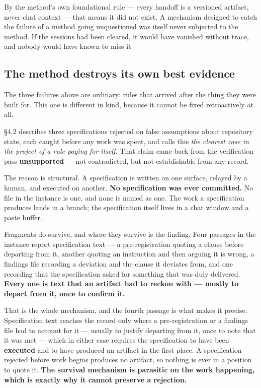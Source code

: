 By the method's own foundational rule --- every handoff is a versioned artifact, never chat context --- that means it did not exist. A mechanism designed to catch the failure of a method going unquestioned was itself never subjected to the method. If the sessions had been cleared, it would have vanished without trace, and nobody would have known to miss it.

\subsection{The method destroys its own best evidence}

The three failures above are ordinary: rules that arrived after the thing they were built for. This one is different in kind, because it cannot be fixed retroactively at all.

\S4.2 describes three specifications rejected on false assumptions about repository state, each caught before any work was spent, and calls this \textit{the clearest case in the project of a rule paying for itself.} That claim came back from the verification pass \textbf{unsupported} --- not contradicted, but not establishable from any record.

The reason is structural. A specification is written on one surface, relayed by a human, and executed on another. \textbf{No specification was ever committed.} No file in the instance is one, and none is named as one. The work a specification produces lands in a branch; the specification itself lives in a chat window and a paste buffer.

Fragments do survive, and where they survive is the finding. Four passages in the instance report specification text --- a pre-registration quoting a clause before departing from it, another quoting an instruction and then arguing it is wrong, a findings file recording a deviation and the clause it deviates from, and one recording that the specification asked for something that was duly delivered. \textbf{Every one is text that an artifact had to reckon with --- mostly to depart from it, once to confirm it.}

That is the whole mechanism, and the fourth passage is what makes it precise. Specification text reaches the record only where a pre-registration or a findings file had to account for it --- usually to justify departing from it, once to note that it was met --- which in either case requires the specification to have been \textbf{executed} and to have produced an artifact in the first place. A specification rejected before work begins produces no artifact, so nothing is ever in a position to quote it. \textbf{The survival mechanism is parasitic on the work happening, which is exactly why it cannot preserve a rejection.}

